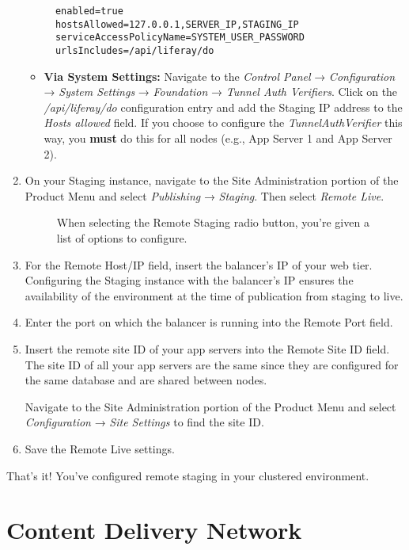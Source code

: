 \begin{enumerate}
\begin{itemize}
\begin{verbatim}
  enabled=true
  hostsAllowed=127.0.0.1,SERVER_IP,STAGING_IP
  serviceAccessPolicyName=SYSTEM_USER_PASSWORD
  urlsIncludes=/api/liferay/do
\end{verbatim}
  \item
    \textbf{Via System Settings:} Navigate to the \emph{Control Panel} →
    \emph{Configuration} → \emph{System Settings} → \emph{Foundation} →
    \emph{Tunnel Auth Verifiers}. Click on the \emph{/api/liferay/do}
    configuration entry and add the Staging IP address to the
    \emph{Hosts allowed} field. If you choose to configure the
    \emph{TunnelAuthVerifier} this way, you \textbf{must} do this for
    all nodes (e.g., App Server 1 and App Server 2).
  \end{itemize}
\item
  On your Staging instance, navigate to the Site Administration portion
  of the Product Menu and select \emph{Publishing} → \emph{Staging}.
  Then select \emph{Remote Live}.

  \begin{figure}
  \centering
  \caption{When selecting the Remote Staging radio button, you're given
  a list of options to configure.}
  \end{figure}
\item
  For the Remote Host/IP field, insert the balancer's IP of your web
  tier. Configuring the Staging instance with the balancer's IP ensures
  the availability of the environment at the time of publication from
  staging to live.
\item
  Enter the port on which the balancer is running into the Remote Port
  field.
\item
  Insert the remote site ID of your app servers into the Remote Site ID
  field. The site ID of all your app servers are the same since they are
  configured for the same database and are shared between nodes.

  Navigate to the Site Administration portion of the Product Menu and
  select \emph{Configuration} → \emph{Site Settings} to find the site
  ID.
\item
  Save the Remote Live settings.
\end{enumerate}

That's it! You've configured remote staging in your clustered
environment.

\chapter{Content Delivery Network}\label{content-delivery-network}

